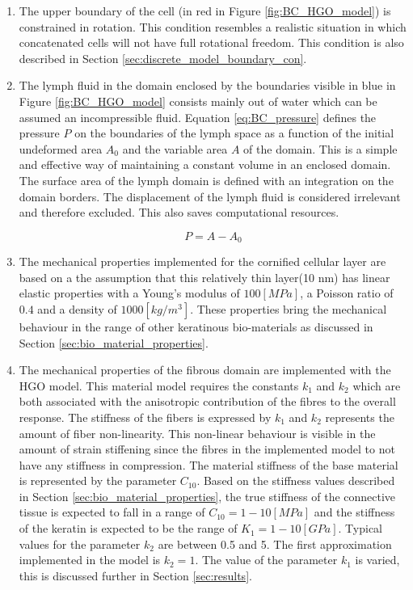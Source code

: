 \begin{enumerate}
    \item The upper boundary of the cell (in red in Figure \ref{fig:BC_HGO_model}) is constrained in rotation. This condition resembles a realistic situation in which concatenated cells will not have full rotational freedom. This condition is also described in Section \ref{sec:discrete_model_boundary_con}. %
    \item The lymph fluid in the domain enclosed by the boundaries visible in blue in Figure \ref{fig:BC_HGO_model} consists mainly out of water which can be assumed an incompressible fluid. Equation \ref{eq:BC_pressure} defines the pressure $P$ on the boundaries of the lymph space as a function of the initial undeformed area $A_{0}$ and the variable area $A$ of the domain. This is a simple and effective way of maintaining a constant volume in an enclosed domain. The surface area of the lymph domain is defined with an integration on the domain borders. The displacement of the lymph fluid is considered irrelevant and therefore excluded. This also saves computational resources. 
    
    \begin{equation}
         P = A - A_{0}
        \label{eq:BC_pressure}
    \end{equation}
    \item The mechanical properties implemented for the cornified cellular layer are based on a the assumption that this relatively thin layer(10 nm) has linear elastic properties with a Young's modulus of $100 [MPa]$, a Poisson ratio of $0.4$ and a density of $1000 [kg/m^3]$. These properties bring the mechanical behaviour in the range of other keratinous bio-materials as discussed in Section \ref{sec:bio_material_properties}.   %
    \item The mechanical properties of the fibrous domain are implemented with the HGO model. This material model requires the constants $k_1$ and $k_2$ which are both associated with the anisotropic contribution of the fibres to the overall response. The stiffness of the fibers is expressed by $k_1$ and $k_2$ represents the amount of fiber non-linearity. This non-linear behaviour is visible in the amount of strain stiffening since the fibres in the implemented model to not have any stiffness in compression. The material stiffness of the base material is represented by the parameter $C_{10}$. Based on the stiffness values described in Section \ref{sec:bio_material_properties}, the true stiffness of the connective tissue is expected to fall in a range of $C_{10} = 1-10 [MPa]$ and the stiffness of the keratin is expected to be the range of $K_1 = 1-10 [GPa]$. Typical values for the parameter $k_2$ are between 0.5 and 5. The first approximation implemented in the model is $k_{2} = 1$. The value of the parameter $k_1$ is varied, this is discussed further in Section \ref{sec:results}.\\ %
\end{enumerate}






